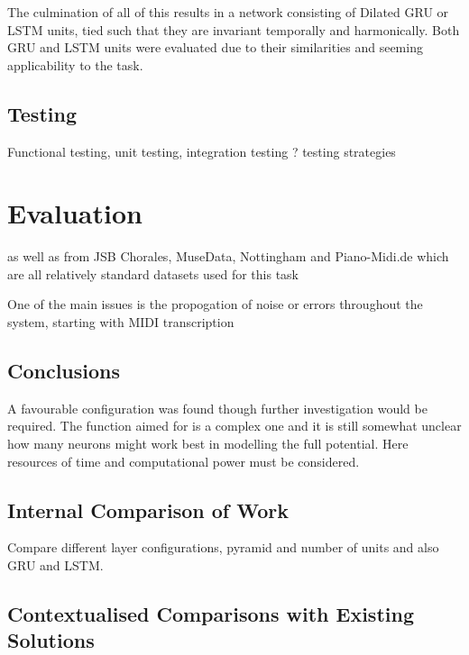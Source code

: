 \documentclass[12pt,]{article}
\begin{document}
The culmination of all of this results in a network consisting of
Dilated GRU or LSTM units, tied such that they are invariant temporally
and harmonically. Both GRU and LSTM units were evaluated due to their
similarities and seeming applicability to the task.

\hypertarget{testing}{%
\subsection{Testing}\label{testing}}

Functional testing, unit testing, integration testing ? testing
strategies

\hypertarget{evaluation}{%
\section{Evaluation}\label{evaluation}}

as well as from JSB Chorales, MuseData, Nottingham and Piano-Midi.de
which are all relatively standard datasets used for this task

One of the main issues is the propogation of noise or errors throughout
the system, starting with MIDI transcription

\hypertarget{conclusions}{%
\subsection{Conclusions}\label{conclusions}}

A favourable configuration was found though further investigation would
be required. The function aimed for is a complex one and it is still
somewhat unclear how many neurons might work best in modelling the full
potential. Here resources of time and computational power must be
considered.

\hypertarget{internal-comparison-of-work}{%
\subsection{Internal Comparison of
Work}\label{internal-comparison-of-work}}

Compare different layer configurations, pyramid and number of units and
also GRU and LSTM.

\hypertarget{contextualised-comparisons-with-existing-solutions}{%
\subsection{Contextualised Comparisons with Existing
Solutions}\label{contextualised-comparisons-with-existing-solutions}}
\end{document}

